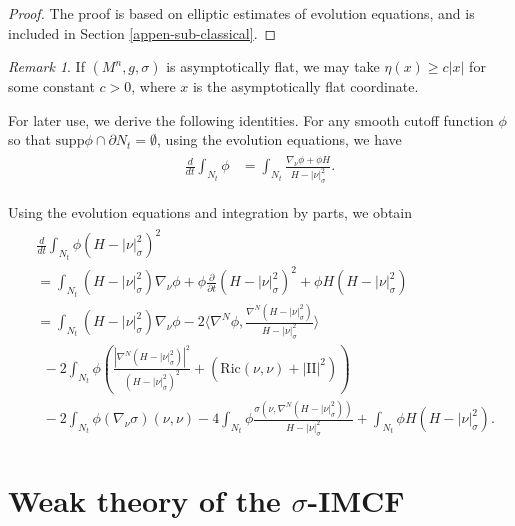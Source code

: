 \documentclass[11pt, letterpaper]{amsart}
\theoremstyle{definition}
\theoremstyle{remark}
\newtheorem{rmk}{Remark}[section]
\begin{document}
\begin{proof}
	The proof is based on elliptic estimates of evolution equations, and is included in Section \ref{appen-sub-classical}.
\end{proof}
\begin{rmk}\label{rmk-choice-eta}
	If $(M^n, g, \sigma  )$ is asymptotically flat, we may take $\eta(x) \geq c |x| $ for some constant $c>0$, where $x$ is the asymptotically flat coordinate.
\end{rmk}



For later use, we derive the following identities. For any smooth cutoff function $\phi $ so that $\mathrm{supp} \phi \cap \partial N_{t} = \emptyset$, using the evolution equations, we have
\begin{align}\label{ddt-phi-area}
	\begin{split}
		\frac{d}{d t} \int_{N_t} \phi &= \int_{N_t} \frac{\nabla _{\nu } \phi + \phi H}{H-|\nu |^2_{\sigma }}.
	\end{split}
\end{align}


Using the evolution equations and integration by parts, we obtain
\begin{align}\label{dt-int-H-nu}
	\begin{split}
		&\frac{d}{d t} \int_{N_t} \phi (H- |\nu |^2_{\sigma })^2 \\
		&= \int_{N_t} (H- |\nu |^2_{\sigma }) \nabla _{\nu } \phi + \phi  \frac{\partial }{\partial t}(H-|\nu |^2_{\sigma })^2 + \phi H (H-|\nu |^2_{\sigma })\\
									&= \int_{N_t} (H-|\nu |^2_{\sigma }) \nabla _{\nu }\phi -2 \langle \nabla ^{N} \phi , \frac{\nabla ^{N}(H-|\nu |^2_{\sigma })}{H- |\nu |^2_{\sigma }} \rangle \\
									&\ \ - 2 \int_{N_t}\phi \left(   \frac{|\nabla ^{N} (H-|\nu |^2_{\sigma })|^2}{(H-|\nu |^2_{\sigma })^2} + \left( \mathrm{Ric}(\nu ,\nu ) +|\mathrm{II}|^2 \right) \right) \\
									&\ \ -2 \int_{N_t} \phi (\nabla _{\nu } \sigma) (\nu , \nu ) - 4 \int_{N_t} \phi \frac{\sigma ( \nu , \nabla ^{N}(H- |\nu |^2_{\sigma }) )}{H- |\nu |^2_{\sigma }} + \int_{N_t}\phi H(H-|\nu |^2_{\sigma }).
	\end{split}
\end{align}



\section{Weak theory of the $\sigma $-IMCF}\label{sect-weak}
\end{document}

